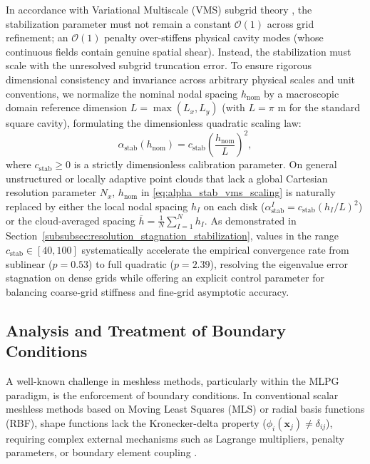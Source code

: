 \documentclass[VANCOUVER,Times1COL]{WileyNJD-v5}
\begin{document}
In accordance with Variational Multiscale (VMS) subgrid theory \cite{hughes1998variational, codina2000stabilization}, the stabilization parameter must not remain a constant $\mathcal{O}(1)$ across grid refinement; an $\mathcal{O}(1)$ penalty over-stiffens physical cavity modes (whose continuous fields contain genuine spatial shear). Instead, the stabilization must scale with the unresolved subgrid truncation error. To ensure rigorous dimensional consistency and invariance across arbitrary physical scales and unit conventions, we normalize the nominal nodal spacing $h_{\mathrm{nom}}$ by a macroscopic domain reference dimension $L = \max(L_x, L_y)$ (with $L = \pi\text{ m}$ for the standard square cavity), formulating the dimensionless quadratic scaling law:
\begin{equation}
    \alpha_{\mathrm{stab}}(h_{\mathrm{nom}}) = c_{\mathrm{stab}} \left(\frac{h_{\mathrm{nom}}}{L}\right)^2,
    \label{eq:alpha_stab_vms_scaling}
\end{equation}
where $c_{\mathrm{stab}} \ge 0$ is a strictly dimensionless calibration parameter. On general unstructured or locally adaptive point clouds that lack a global Cartesian resolution parameter $N_x$, $h_{\mathrm{nom}}$ in \eqref{eq:alpha_stab_vms_scaling} is naturally replaced by either the local nodal spacing $h_I$ on each disk ($\alpha_{\mathrm{stab}}^I = c_{\mathrm{stab}} (h_I / L)^2$) or the cloud-averaged spacing $\overline{h} = \frac{1}{N}\sum_{I=1}^N h_I$. As demonstrated in Section~\ref{subsubsec:resolution_stagnation_stabilization}, values in the range $c_{\mathrm{stab}} \in [40, 100]$ systematically accelerate the empirical convergence rate from sublinear ($p = 0.53$) to full quadratic ($p = 2.39$), resolving the eigenvalue error stagnation on dense grids while offering an explicit control parameter for balancing coarse-grid stiffness and fine-grid asymptotic accuracy.

\subsection{Analysis and Treatment of Boundary Conditions}
\label{subsec:boundary_treatment}

A well-known challenge in meshless methods, particularly within the MLPG paradigm, is the enforcement of boundary conditions. In conventional scalar meshless methods based on Moving Least Squares (MLS) or radial basis functions (RBF), shape functions lack the Kronecker-delta property ($\phi_i(\mathbf{x}_j) \ne \delta_{ij}$), requiring complex external mechanisms such as Lagrange multipliers, penalty parameters, or boundary element coupling \cite{atluri2002meshless}.
\end{document}
